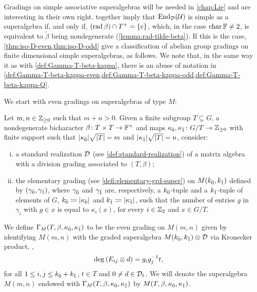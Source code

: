 Gradings on simple associative superalgebras will be needed in \cref{chap:Lie} and are interesting in their own right. 
 together imply that $\operatorname{End}_{\mathcal{D}} (\mathcal U)$ is simple as a superalgebra if, and only if, $(\operatorname{rad} \beta) \cap T^+ = \{e\}$, which, in the case $\operatorname{char} \mathbb{F} \neq 2$, is equivalent to $\tilde\beta$ being nondegenerate (\cref{lemma:rad-tilde-beta}). 
If this is the case,  \cref{thm:iso-D-even,thm:iso-D-odd} give a classification of abelian group gradings on finite dimensional simple superalgebras, as follows. 
We note that, in the same way it as with  \cref{def:Gamma-T-beta-kappa}, there is an abuse of notation in \cref{def:Gamma-T-beta-kappa-even,def:Gamma-T-beta-kappa-odd,def:Gamma-T-beta-kappa-Q}. 



We start with even gradings on superalgebras of type $M$:

\begin{defi}\label{def:Gamma-T-beta-kappa-even}
    Let $m, n\in \mathbb{Z}_{\geq 0}$ such that $m+n > 0$. 
    Given a finite subgroup $T \subseteq G$, a nondegenerate bicharacter $\beta\colon T\times T \to \mathbb{F}^\times$ and maps $\kappa_{\bar{0}}, \kappa_{\bar{1}} \colon G/T \to \mathbb{Z}_{\geq 0}$ with finite support such that $|\kappa_{\bar{0}}| \sqrt{|T|} = m$ and $|\kappa_{\bar{1}}| \sqrt{|T|} = n$, consider:
    \begin{enumerate}[(i)]
        \item a standard realization $\mathcal{D}$ (see \cref{def:standard-realization}) of a matrix algebra with a division grading associated to $(T,\beta)$;
        \item the elementary grading (see \cref{defi:elementary-grd-super}) on $M(k_{\bar{0}}, k_{\bar{1}})$ defined by $(\gamma_{\bar{0}}, \gamma_{\bar{1}})$, where $\gamma_{\bar{0}}$ and $\gamma_{\bar{1}}$ are, respectively, a $k_{\bar{0}}$-tuple and a $k_{\bar{1}}$-tuple of elements of $G$, $k_{\bar{0}} \coloneqq |\kappa_{\bar{0}}|$ and $k_{\bar{1}} \coloneqq |\kappa_{\bar{1}}|$, such that the number of entries $g$ in $\gamma_i$ with $g\in x$ is equal to $\kappa_i (x)$, for every $i\in \mathbb{Z}_2$ and $x\in G/T$.
    \end{enumerate}
    We define $\Gamma_M (T, \beta, \kappa_{\bar{0}}, \kappa_{\bar{1}})$ to be the even grading on $M(m,n)$ given by identifying $M(m,n)$ with the graded superalgebra $M(k_{\bar{0}}, k_{\bar{1}}) \otimes \mathcal{D}$ via Kronecker product, \ie,
    \[
        \deg \left( E_{ij} \otimes d \right) = g_ig_j^{-1} t,
    \] 
    for all $1\leq i, j \leq k_{\bar{0}} + k_{\bar{1}}$, $t\in T$ and $0 \neq d \in \mathcal{D}_t$. 
    We will denote the superalgebra $M(m,n)$ endowed with $\Gamma_M (T, \beta, \kappa_{\bar{0}}, \kappa_{\bar{1}})$ by $M(T, \beta, \kappa_{\bar{0}}, \kappa_{\bar{1}})$. 
\end{defi}

